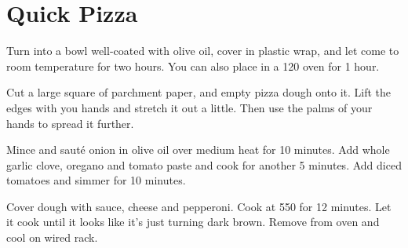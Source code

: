 \section{Quick Pizza}
\begin{recipe}



Turn into a bowl well-coated with olive oil, cover in plastic wrap, and let
come to room temperature for two hours. You can also place in a 120\degree{} oven
for 1 hour.

Cut a large square of parchment paper, and empty pizza dough onto it. Lift the
edges with you hands and stretch it out a little. Then use the palms of your
hands to spread it further.


Mince and sauté onion in olive oil over medium heat for 10 minutes. Add whole
garlic clove, oregano and tomato paste and cook for another 5 minutes. Add
diced tomatoes and simmer for 10 minutes.


Cover dough with sauce, cheese and pepperoni. Cook at 550\degree{} for 12 minutes.
Let it cook until it looks like it's just turning dark brown. Remove from oven
and cool on wired rack.


\end{recipe}
